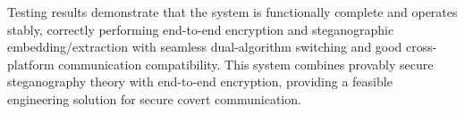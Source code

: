\begin{abstractEn}
    Testing results demonstrate that the system is functionally complete and operates stably, correctly performing end-to-end encryption and steganographic embedding/extraction with seamless dual-algorithm switching and good cross-platform communication compatibility. This system combines provably secure steganography theory with end-to-end encryption, providing a feasible engineering solution for secure covert communication.
\end{abstractEn}
